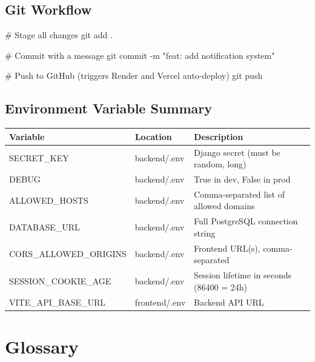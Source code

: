 \documentclass[12pt,a4paper]{article}
\begin{document}
\subsection{Git Workflow}
\begin{termbox}
# Stage all changes
git add .

# Commit with a message
git commit -m "feat: add notification system"

# Push to GitHub (triggers Render and Vercel auto-deploy)
git push
\end{termbox}

\subsection{Environment Variable Summary}
\begin{center}
\begin{tabularx}{\textwidth}{llX}
\toprule
\textbf{Variable} & \textbf{Location} & \textbf{Description} \\
\midrule
SECRET\_KEY & backend/.env & Django secret (must be random, long) \\
DEBUG & backend/.env & True in dev, False in prod \\
ALLOWED\_HOSTS & backend/.env & Comma-separated list of allowed domains \\
DATABASE\_URL & backend/.env & Full PostgreSQL connection string \\
CORS\_ALLOWED\_ORIGINS & backend/.env & Frontend URL(s), comma-separated \\
SESSION\_COOKIE\_AGE & backend/.env & Session lifetime in seconds (86400 = 24h) \\
VITE\_API\_BASE\_URL & frontend/.env & Backend API URL \\
\bottomrule
\end{tabularx}
\end{center}


\section{Glossary}
\end{document}

